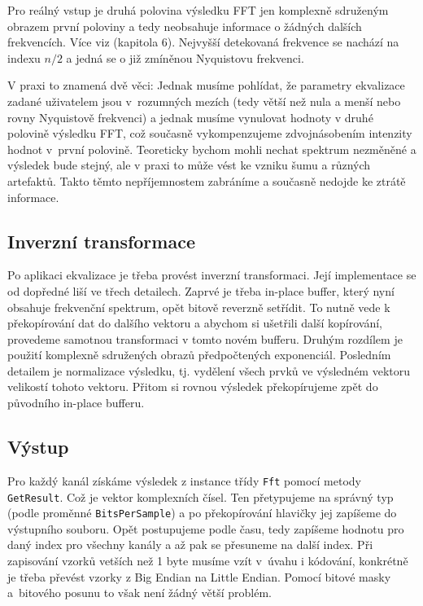 \documentclass[11pt]{article} %
\begin{document}
Pro reálný vstup je druhá polovina výsledku FFT jen komplexně sdruženým obrazem první poloviny a tedy neobsahuje informace o žádných dalších frekvencích. Více viz \cite{fftguru} (kapitola 6). Nejvyšší detekovaná frekvence se nachází na indexu $n/2$ a jedná se o již zmíněnou Nyquistovu frekvenci.

V praxi to znamená dvě věci: Jednak musíme pohlídat, že parametry ekvalizace zadané uživatelem jsou v~rozumných mezích (tedy větší než nula a menší nebo rovny Nyquistově frekvenci) a jednak musíme vynulovat hodnoty v druhé polovině výsledku FFT, což současně vykompenzujeme zdvojnásobením intenzity hodnot v~první polovině. Teoreticky bychom mohli nechat spektrum nezměněné a výsledek bude stejný, ale v praxi to může vést ke vzniku šumu a různých artefaktů. Takto těmto nepříjemnostem zabráníme a současně nedojde ke ztrátě informace.
\subsection{Inverzní transformace}
Po aplikaci ekvalizace je třeba provést inverzní transformaci. Její implementace se od dopředné liší ve třech detailech. Zaprvé je třeba in-place buffer, který nyní obsahuje frekvenční spektrum, opět bitově reverzně setřídit. To nutně vede k překopírování dat do dalšího vektoru a abychom si ušetřili další kopírování, provedeme samotnou transformaci v tomto novém bufferu. Druhým rozdílem je použití komplexně sdružených obrazů předpočtených exponenciál. Posledním detailem je normalizace výsledku, tj. vydělení všech prvků ve výsledném vektoru velikostí tohoto vektoru. Přitom si rovnou výsledek překopírujeme zpět do původního in-place bufferu.
\subsection{Výstup}
Pro každý kanál získáme výsledek z instance třídy \texttt{Fft} pomocí metody \texttt{GetResult}. Což je vektor komplexních čísel. Ten přetypujeme na správný typ (podle proměnné \texttt{BitsPerSample}) a po překopírování hlavičky jej zapíšeme do výstupního souboru. Opět postupujeme podle času, tedy zapíšeme hodnotu pro daný index pro všechny kanály a až pak se přesuneme na další index. Při zapisování vzorků vetších než 1 byte musíme vzít v~úvahu i kódování, konkrétně je třeba převést vzorky z Big Endian na Little Endian. Pomocí bitové masky a~bitového posunu to však není žádný větší problém.
\end{document}
